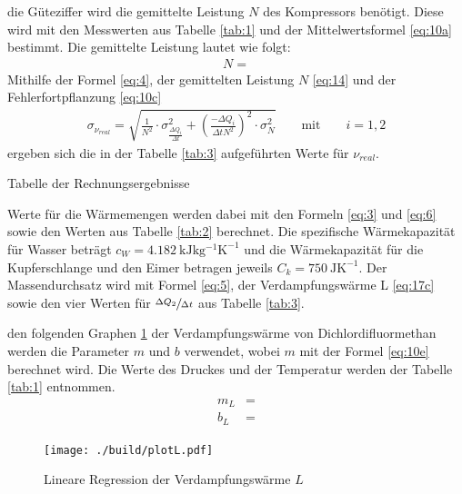 \justifying die Güteziffer wird die gemittelte Leistung $N$ des Kompressors benötigt. Diese wird mit den Messwerten aus Tabelle
\ref{tab:1} und der Mittelwertsformel \eqref{eq:10a} bestimmt. Die gemittelte Leistung lautet wie folgt:
\begin{align}
    N = \text{} \label{eq:14}
\end{align}
Mithilfe der Formel \eqref{eq:4}, der gemittelten Leistung $N$ \eqref{eq:14} und der Fehlerfortpflanzung \eqref{eq:10c}
\begin{align}
    \sigma_{\nu_{real}} = \sqrt{\frac{1}{N^2} \cdot \sigma_{\frac{\Delta Q_i}{\Delta t}}^2 + \left( \frac{-\Delta Q_i}{\Delta t N^2} \right)^2 \cdot \sigma_{N}^2} \qquad \text{mit} \qquad i = 1,2 \label{eq:15}
\end{align}
ergeben sich die in der Tabelle \ref{tab:3} aufgeführten Werte für $\nu_{real}$.

\begin{table}[H]
    \centering
    
    \caption{Tabelle der Rechnungsergebnisse}
    \label{tab:3}
\end{table} 
\justifying Werte für die Wärmemengen werden dabei mit den Formeln \eqref{eq:3} und \eqref{eq:6}
sowie den Werten aus Tabelle \ref{tab:2} berechnet. Die spezifische Wärmekapazität für Wasser
beträgt $c_W=\SI{4.182}{\kilo\joule\kilo\gram\tothe{-1}\kelvin\tothe{-1}} $ \cite{demtroder2018warmelehre} und
die Wärmekapazität für die Kupferschlange und den Eimer betragen jeweils $C_k=\SI{750}{\joule\kelvin\tothe{-1}} $.
Der Massendurchsatz wird mit Formel \eqref{eq:5}, der Verdampfungswärme L \eqref{eq:17c} sowie
den vier Werten für $\sfrac{\Delta Q_2}{\Delta t} $ aus Tabelle \ref{tab:3}.

\justifying den folgenden Graphen \ref{fig:4} der Verdampfungswärme von Dichlordifluormethan werden die Parameter $m$ und $b$ verwendet, wobei $m$ mit der
Formel \eqref{eq:10e} berechnet wird. Die Werte des Druckes und der Temperatur werden der Tabelle \ref{tab:1} entnommen. 
\begin{subequations}\label{eq:16}
\begin{align}
    m_L &= \text{}\label{eq:16a}\\
    b_L &= \text{}\label{eq:16b}
\end{align}
\end{subequations}

\begin{figure}[H]
    \centering
    \texttt{[image: ./build/plotL.pdf]}
    \caption{Lineare Regression der Verdampfungswärme $L$}
    \label{fig:4}
\end{figure}

